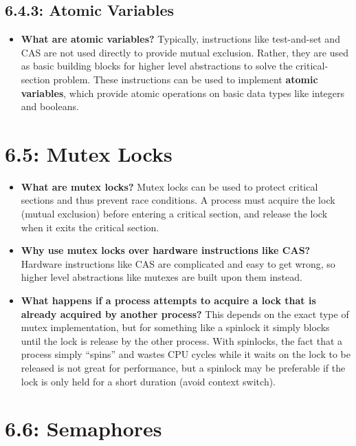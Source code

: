 \documentclass[12pt]{article}
\begin{document}
\subsection*{6.4.3: Atomic Variables}

\begin{itemize}
    \item \textbf{What are atomic variables?} Typically, instructions like test-and-set and CAS are not used directly to provide mutual exclusion. Rather, they are used as basic building blocks for higher level abstractions to solve the critical-section problem. These instructions can be used to implement \textbf{atomic variables}, which provide atomic operations on basic data types like integers and booleans.
\end{itemize}

\section*{6.5: Mutex Locks}

\begin{itemize}
    \item \textbf{What are mutex locks?} Mutex locks can be used to protect critical sections and thus prevent race conditions. A process must acquire the lock (mutual exclusion) before entering a critical section, and release the lock when it exits the critical section.
    \item \textbf{Why use mutex locks over hardware instructions like CAS?} Hardware instructions like CAS are complicated and easy to get wrong, so higher level abstractions like mutexes are built upon them instead.
    \item \textbf{What happens if a process attempts to acquire a lock that is already acquired by another process?} This depends on the exact type of mutex implementation, but for something like a spinlock it simply blocks until the lock is release by the other process. With spinlocks, the fact that a process simply ``spins'' and wastes CPU cycles while it waits on the lock to be released is not great for performance, but a spinlock may be preferable if the lock is only held for a short duration (avoid context switch).
\end{itemize}

\section*{6.6: Semaphores}
\end{document}
